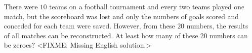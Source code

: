 \problem
There were $10$ teams on a football tournament and every two teams played one
match, but the scoreboard was lost and only the numbers of goals scored and
conceded for each team were saved.
However, from these $20$ numbers, the results of all matches can be
reconstructed.
At least how many of these 20 numbers can be zeroes?
\solution
<FIXME: Missing English solution.>
\endproblem
